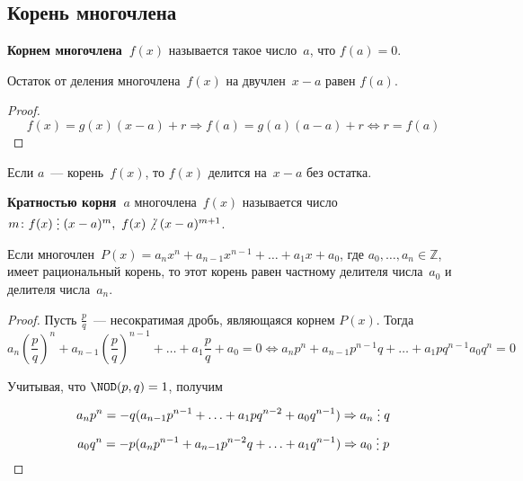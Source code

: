\subsection{Корень многочлена}
 \textbf{Корнем многочлена~$f(x)$} называется такое число~$a$, что $f(a) = 0$.

\begin{theorem}[Безу]
Остаток от деления многочлена~$f(x)$ на двучлен~$x - a$ равен $f(a)$.
\end{theorem}
\begin{proof}
\begin{equation*}
f(x) = g(x)(x - a) + r \Rightarrow f(a) = g(a)(a - a) + r \Leftrightarrow r = f(a)
\end{equation*}
\end{proof}

\begin{consequent}
\label{conseq:division_by_binomial}
Если $a$~--- корень~$f(x)$, то $f(x)$ делится на~$x - a$ без остатка.
\end{consequent}

\textbf{Кратностью корня~$a$} многочлена~$f(x)$ называется число~
$m \colon f(x) \mult (x - a)^m, \ f(x) \notmult (x - a)^{m+1}$.

\begin{theorem}
Если многочлен~$P(x) = a_n x^n + a_{n-1} x^{n-1} + \ldots + a_1 x + a_0$, где $a_0, \ldots, a_n \in \mathbb Z$, имеет рациональный корень, то этот корень равен частному делителя числа~$a_0$ и делителя числа~$a_n$.
\end{theorem}
\begin{proof}
Пусть $\frac{p}q$~--- несократимая дробь, являющаяся корнем $P(x)$.
Тогда
\begin{equation*}
a_n \left( \frac{p}q \right)^n + a_{n-1} \left( \frac{p}q \right)^{n-1} + \ldots + a_1 \frac{p}q + a_0 = 0 \Leftrightarrow
a_n p^n + a_{n-1} p^{n-1} q + \ldots + a_1 pq^{n-1} a_0 q^n = 0
\end{equation*}

Учитывая, что $\NOD(p, q) = 1$, получим
\begin{equation*}
a_n p^n = -q (a_{n-1} p^{n-1} + \ldots + a_1 pq^{n-2} + a_0 q^{n-1}) \Rightarrow
a_n \mult q
\end{equation*}
\begin{equation*}
a_0 q^n = -p (a_n p^{n-1} + a_{n-1} p^{n-2} q + \ldots + a_1 q^{n-1}) \Rightarrow
a_0 \mult p
\end{equation*}
\end{proof}